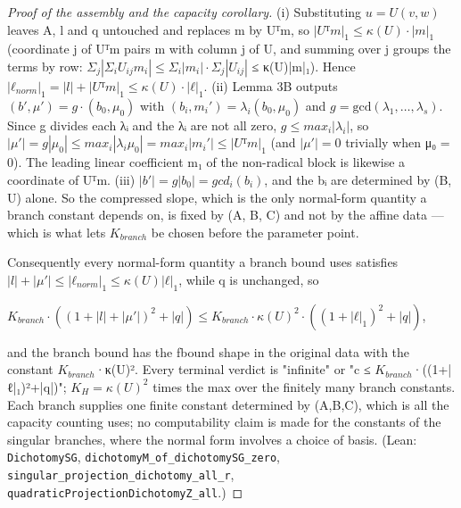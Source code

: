 \begin{proof}[Proof of the assembly and the capacity corollary]
(i)   Substituting $u = U(v,w)$ leaves A, l and q untouched and replaces m by         Uᵀm, so $|Uᵀm|_{1} ≤ κ(U)·|m|_{1}$ (coordinate j of Uᵀm pairs m with column j of U,         and summing over j groups the terms by row: $Σ_{j}|Σ_{i} U_{ij}m_{i}| ≤ Σ_{i}|m_{i}|·Σ_{j}|U_{ij}|$         ≤ κ(U)|m|₁). Hence $|ℓ_{norm}|_{1} = |l| + |Uᵀm|_{1} ≤ κ(U)·|ℓ|_{1}$.   (ii)  Lemma 3B outputs $(b′, μ′) = g·(b_{0}, μ_{0})$ with $(b_{i}, m_{i}′) = λ_{i}(b_{0}, μ_{0})$ and         $g = \mathrm{gcd}(λ_{1},…,λ_{s})$. Since g divides each λᵢ and the λᵢ are not all zero,         $g ≤ max_{i}|λ_{i}|$, so $|μ′| = g|μ_{0}| ≤ max_{i}|λ_{i}μ_{0}| = max_{i}|m_{i}′| ≤ |Uᵀm|_{1}$ (and         $|μ′| = 0$ trivially when μ₀ = 0). The leading linear coefficient m₁ of         the non-radical block is likewise a coordinate of Uᵀm.   (iii) $|b′| = g|b_{0}| = gcd_{i}(b_{i})$, and the bᵢ are determined by (B, U) alone.         So the compressed slope, which is the only normal-form quantity a branch         constant depends on, is fixed by (A, B, C) and not by the affine data —         which is what lets $K_{branch}$ be chosen before the parameter point.

Consequently every normal-form quantity a branch bound uses satisfies $|l| + |μ′| ≤ |ℓ_{norm}|_{1} ≤ κ(U)|ℓ|_{1}$, while q is unchanged, so

$K_{branch}·((1+|l|+|μ′|)^{2} + |q|) ≤ K_{branch}·κ(U)^{2}·((1+|ℓ|_{1})^{2} + |q|)$,

and the branch bound has the fbound shape in the original data with the constant $K_{branch}$·κ(U)². Every terminal verdict is "infinite" or "c ≤ $K_{branch}$·((1+|ℓ|₁)²+|q|)"; $K_{H} = κ(U)^{2}$ times the max over the finitely many branch constants. Each branch supplies one finite constant determined by (A,B,C), which is all the capacity counting uses; no computability claim is made for the constants of the singular branches, where the normal form involves a choice of basis. (Lean: \texttt{DichotomySG}, \texttt{dichotomyM\_\allowbreak{}of\_\allowbreak{}dichotomySG\_\allowbreak{}zero}, \texttt{singular\_\allowbreak{}projection\_\allowbreak{}dichotomy\_\allowbreak{}all\_\allowbreak{}r}, \texttt{quadraticProjectionDichotomyZ\_\allowbreak{}all}.)


\end{proof}
